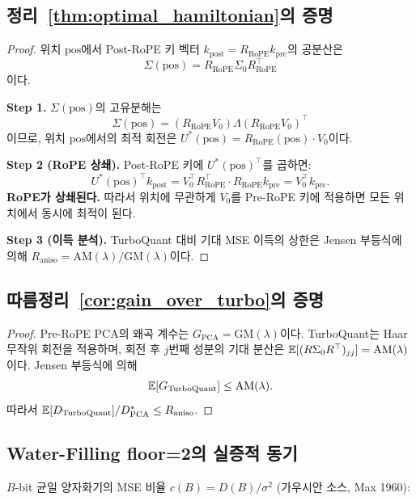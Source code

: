 \subsection{정리~\ref{thm:optimal_hamiltonian}의 증명}
\label{sec:proof_optimal}

\begin{proof}
위치 $\mathrm{pos}$에서 Post-RoPE 키 벡터 $k_{\mathrm{post}} = R_{\mathrm{RoPE}} k_{\mathrm{pre}}$의 공분산은
\[
\Sigma(\mathrm{pos}) = R_{\mathrm{RoPE}} \Sigma_0 R_{\mathrm{RoPE}}^\top
\]
이다.

\textbf{Step 1.} $\Sigma(\mathrm{pos})$의 고유분해는
\[
\Sigma(\mathrm{pos}) = (R_{\mathrm{RoPE}} V_0) \Lambda (R_{\mathrm{RoPE}} V_0)^\top
\]
이므로, 위치 $\mathrm{pos}$에서의 최적 회전은 $U^*(\mathrm{pos}) = R_{\mathrm{RoPE}}(\mathrm{pos}) \cdot V_0$이다.

\textbf{Step 2 (RoPE 상쇄).} Post-RoPE 키에 $U^*(\mathrm{pos})^\top$를 곱하면:
\[
U^*(\mathrm{pos})^\top k_{\mathrm{post}} = V_0^\top R_{\mathrm{RoPE}}^\top \cdot R_{\mathrm{RoPE}} k_{\mathrm{pre}} = V_0^\top k_{\mathrm{pre}}.
\]
\textbf{RoPE가 상쇄된다.} 따라서 위치에 무관하게 $V_0$를 Pre-RoPE 키에 적용하면 모든 위치에서 동시에 최적이 된다.

\textbf{Step 3 (이득 분석).} TurboQuant 대비 기대 MSE 이득의 상한은 Jensen 부등식에 의해 $R_{\mathrm{aniso}} = \mathrm{AM}(\lambda)/\mathrm{GM}(\lambda)$이다.
\end{proof}

\subsection{따름정리~\ref{cor:gain_over_turbo}의 증명}

\begin{proof}
Pre-RoPE PCA의 왜곡 계수는 $G_{\mathrm{PCA}} = \mathrm{GM}(\lambda)$이다. TurboQuant는 Haar 무작위 회전을 적용하며, 회전 후 $j$번째 성분의 기대 분산은 $\mathbb{E}[(R\Sigma_0 R^\top)_{jj}] = \mathrm{AM}(\lambda)$이다. Jensen 부등식에 의해
\[
\mathbb{E}[G_{\mathrm{TurboQuant}}] \leq \mathrm{AM}(\lambda).
\]
따라서 $\mathbb{E}[D_{\mathrm{TurboQuant}}] / D^*_{\mathrm{PCA}} \leq R_{\mathrm{aniso}}$.
\end{proof}

\subsection{Water-Filling floor=2의 실증적 동기}

$B$-bit 균일 양자화기의 MSE 비율 $c(B) = D(B) / \sigma^2$ (가우시안 소스, Max 1960):

